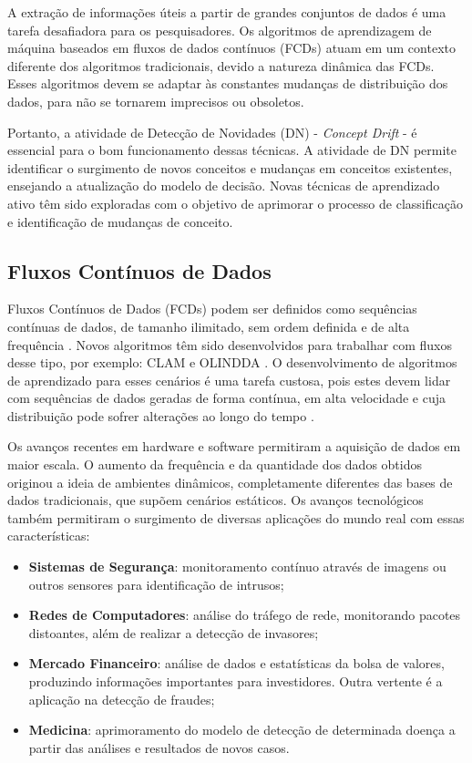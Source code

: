 \documentclass[qual, classic, a4paper]{ufbathesis}
\begin{document}
A extração de informações úteis a partir de grandes conjuntos de dados é uma tarefa desafiadora para os pesquisadores.
Os algoritmos de aprendizagem de máquina baseados em fluxos de dados contínuos (FCDs) atuam em um contexto diferente dos algoritmos tradicionais, 
devido a natureza dinâmica das FCDs.
Esses algoritmos devem se adaptar às constantes mudanças de distribuição dos dados, para não se tornarem imprecisos ou obsoletos.

Portanto, a atividade de Detecção de Novidades (DN) - \textit{Concept Drift} - é essencial para o bom funcionamento dessas técnicas. A atividade de DN permite identificar o surgimento de novos conceitos e mudanças em conceitos existentes, ensejando a atualização do modelo de decisão. Novas técnicas de aprendizado ativo têm sido exploradas com o objetivo de aprimorar o processo de classificação e identificação de mudanças de conceito. 

\subsection{Fluxos Contínuos de Dados}

Fluxos Contínuos de Dados (FCDs) podem ser definidos como sequências contínuas de dados, de tamanho ilimitado, sem ordem definida e de alta frequência \cite{Babcock:2002:MID:543613.543615}. Novos algoritmos têm sido desenvolvidos para trabalhar com fluxos desse tipo, por exemplo: CLAM \cite{malkhateeb} e OLINDDA \cite{Spinosa:2009:NDA:1551768.1551770}. O desenvolvimento de algoritmos de aprendizado para esses cenários é uma tarefa custosa, pois estes devem lidar com sequências de dados geradas de forma contínua, em alta velocidade e cuja distribuição pode sofrer alterações ao longo do tempo \cite{Gama:2014:survey}.

Os avanços recentes em hardware e software permitiram a aquisição de dados em maior escala. O aumento da frequência e da quantidade dos dados obtidos originou a ideia de ambientes dinâmicos, completamente diferentes das bases de dados tradicionais, que supõem cenários estáticos. Os avanços tecnológicos também permitiram o surgimento de diversas aplicações do mundo real com essas características: 

\begin{itemize}
    \item \textbf{Sistemas de Segurança}: monitoramento contínuo através de imagens ou outros sensores para identificação de intrusos;

    \item \textbf{Redes de Computadores}: análise do tráfego de rede, monitorando pacotes distoantes, além de realizar a detecção de invasores;

    \item \textbf{Mercado Financeiro}: análise de dados e estatísticas da bolsa de valores, produzindo informações importantes para investidores. Outra vertente é a aplicação na detecção de fraudes;

    \item \textbf{Medicina}: aprimoramento do modelo de detecção de determinada doença a partir das análises e resultados de novos casos.
\end{itemize}
\end{document}
